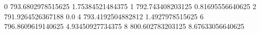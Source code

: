 0 793.6802978515625 1.75384521484375
1 792.743408203125 0.81695556640625
2 791.9264526367188 0.0
4 793.4192504882812 1.4927978515625
6 796.8609619140625 4.93450927734375
8 800.602783203125 8.67633056640625
